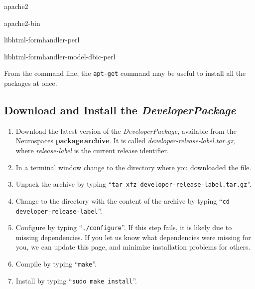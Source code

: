 \documentclass[12pt]{article}
\begin{document}
\begin{description}[noitemsep,nolistsep]

% 
% 
%
% 
% 

\item apache2
\item apache2-bin
\item libhtml-formhandler-perl
\item libhtml-formhandler-model-dbic-perl

\end{description}




From the command line, the {\tt apt-get} command may be useful to
install all the packages at once.


\subsection*{Download and Install the {\emph{DeveloperPackage}}}

\begin{enumerate}
   \item Download the latest version of the {\it DeveloperPackage}, available from the Neurospaces \href{http://repo-genesis3.cbi.utsa.edu/src/}{\bf package\,archive}. It is called {\it developer-release-label.tar.gz}, where {\it release-label} is the current release identifier.
   \item In a terminal window change to the directory where you downloaded the file.
   \item Unpack the archive by typing ``{\tt tar xfz developer-release-label.tar.gz}''.
   \item Change to the directory with the content of the archive by typing ``{\tt cd developer-release-label}''.
   \item Configure by typing ``{\tt ./configure}''.  If this step fails, it is likely due to missing dependencies.  If you let us know what dependencies were missing for you, we can update this page, and minimize installation problems for others.
   \item Compile by typing ``{\tt make}''.
   \item Install by typing ``{\tt sudo make install}''. 
\end{enumerate}
\end{document}
